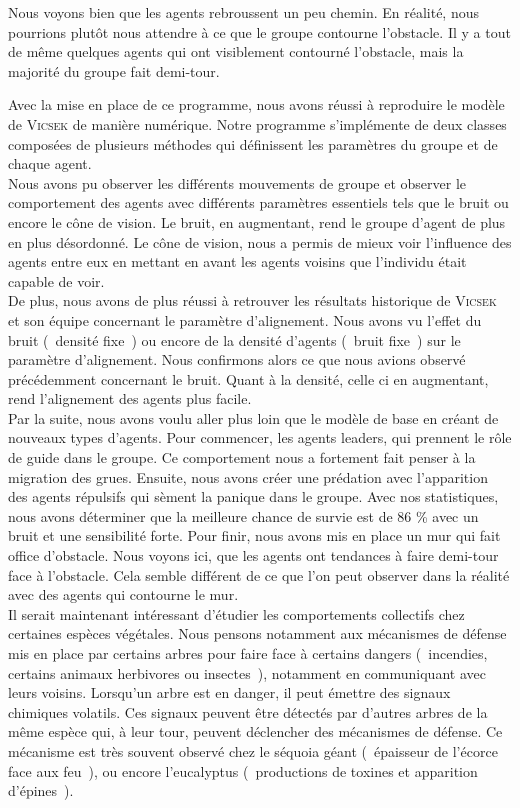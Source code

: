 \documentclass[french, a4paper, 12pt, openany]{report}
\begin{document}
	Nous voyons bien que les agents rebroussent un peu chemin. En réalité, nous pourrions plutôt nous attendre à ce que le groupe contourne l'obstacle. Il y a tout de même quelques agents qui ont visiblement contourné l'obstacle, mais la majorité du groupe fait demi-tour.
	
	

   Avec la mise en place de ce programme, nous avons réussi à reproduire le modèle de \textsc{Vicsek} de manière numérique. Notre programme s'implémente de deux classes composées de plusieurs méthodes qui définissent les paramètres du groupe et de chaque agent.\\
   
    Nous avons pu observer les différents mouvements de groupe et observer le comportement des agents avec différents paramètres essentiels tels que le bruit ou encore le cône de vision. Le bruit, en augmentant, rend le groupe d'agent de plus en plus désordonné. Le cône de vision, nous a permis de mieux voir l'influence des agents entre eux en mettant en avant les agents voisins que l'individu était capable de voir.\\
    
    De plus, nous avons de plus réussi à retrouver les résultats historique de \textsc{Vicsek} et son équipe concernant le paramètre d'alignement. Nous avons vu l'effet du bruit (~densité fixe~) ou encore de la densité d'agents (~bruit fixe~) sur le paramètre d'alignement. Nous confirmons alors ce que nous avions observé précédemment concernant le bruit. Quant à la densité, celle ci en augmentant, rend l'alignement des agents plus facile. \\
    
    Par la suite, nous avons voulu aller plus loin que le modèle de base en créant de nouveaux types d'agents. Pour commencer, les agents leaders, qui prennent le rôle de guide dans le groupe. Ce comportement nous a fortement fait penser à la migration des grues. 
    Ensuite, nous avons créer une prédation avec l'apparition des agents répulsifs qui sèment la panique dans le groupe. Avec nos statistiques, nous avons déterminer que la meilleure chance de survie est de 86 \% avec un bruit et une sensibilité forte. 
    Pour finir, nous avons mis en place un mur qui fait office d'obstacle. Nous voyons ici, que les agents ont tendances à faire demi-tour face à l'obstacle. Cela semble différent de ce que l'on peut observer dans la réalité avec des agents qui contourne le mur.\\
    
    Il serait maintenant intéressant d'étudier les comportements collectifs chez certaines espèces végétales. Nous pensons notamment aux mécanismes de défense mis en place par certains arbres pour faire face à certains dangers (~incendies, certains animaux herbivores ou insectes~), notamment en communiquant avec leurs voisins. Lorsqu'un arbre est en danger, il peut émettre des signaux chimiques volatils. Ces signaux peuvent être détectés par d'autres arbres de la même espèce qui, à leur tour, peuvent déclencher des mécanismes de défense. Ce mécanisme est très souvent observé chez le séquoia géant (~épaisseur de l'écorce face aux feu~), ou encore l'eucalyptus (~productions de toxines et apparition d'épines~). 
\end{document}
